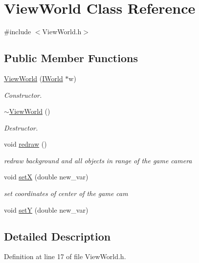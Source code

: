 \hypertarget{classViewWorld}{\section{View\-World Class Reference}
\label{classViewWorld}
}


{\ttfamily \#include $<$View\-World.\-h$>$}

\subsection*{Public Member Functions}
\begin{DoxyCompactItemize}
\item 
\hyperlink{classViewWorld_a010e83eebcfa828f288e4c186ac97284}{View\-World} (\hyperlink{classIWorld}{I\-World} $\ast$w)
\begin{DoxyCompactList}\small\item\em Constructor. \end{DoxyCompactList}\item 
\hyperlink{classViewWorld_abb9df78187bde4033e76a0b54040bf7c}{$\sim$\-View\-World} ()
\begin{DoxyCompactList}\small\item\em Destructor. \end{DoxyCompactList}\item 
void \hyperlink{classViewWorld_aad2482a6e97ebf49c0c2c6be94790ed6}{redraw} ()
\begin{DoxyCompactList}\small\item\em redraw background and all objects in range of the game camera \end{DoxyCompactList}\item 
void \hyperlink{classViewWorld_a7ebce26c23ecfd8440b963bca91bb5bb}{set\-X} (double new\-\_\-var)
\begin{DoxyCompactList}\small\item\em set coordinates of center of the game cam \end{DoxyCompactList}\item 
void \hyperlink{classViewWorld_afde0728835545722c51fcf1c88eba6d0}{set\-Y} (double new\-\_\-var)
\end{DoxyCompactItemize}


\subsection{Detailed Description}


Definition at line 17 of file View\-World.\-h.



